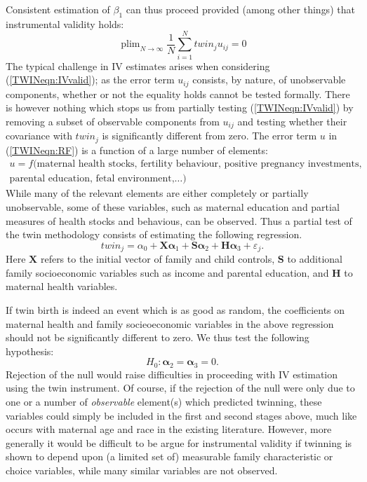 \documentclass[subeqn]{article}
\DeclareMathOperator{\plim}{plim}
\begin{document}
\begin{spacing}{1.4}
Consistent estimation of $\beta_1$ can thus proceed provided (among other
things) that instrumental validity holds:
\begin{equation}
\label{TWINeqn:IVvalid}
\plim_{N\to \infty} \frac{1}{N}\sum_{i=1}^N twin_ju_{ij}=0
\end{equation}
The typical challenge in IV estimates arises when considering 
(\ref{TWINeqn:IVvalid}); as the error term $u_{ij}$ consists, by nature, of 
unobservable components, whether or not the equality holds cannot be tested 
formally.  There is however nothing which stops us from partially testing 
(\ref{TWINeqn:IVvalid}) by removing a subset of observable components from $u_{ij}$
and testing whether their covariance with $twin_j$ is significantly different
from zero.  The error term $u$ in (\ref{TWINeqn:RF}) is a function of a large 
number of elements:
\begin{equation}
\label{TWINeqn:IVbias}
\begin{split}
u=f(\text{maternal health stocks, fertility behaviour, positive pregnancy investments,}  \\
\text{parental education, fetal environment,}\ldots)
\end{split}
\end{equation}
While many of the relevant elements are either completely or partially 
unobservable, some of these variables, such as maternal education and partial 
measures of health stocks and behavious, can be observed.  Thus a partial test 
of the twin methodology consists of estimating the following regression.
\begin{equation}
\label{TWINeqn:twinreg}
twin_{j}=\alpha_0 + \bm{X}\bm{\alpha}_1 + \bm{S}\bm{\alpha}_2
                  + \bm{H}\bm{\alpha}_3 + \varepsilon_{j}.
\end{equation}
Here $\bm{X}$ refers to the initial vector of family and child controls, $\bm{S}$
to additional family socioeconomic variables such as income and parental 
education, and $\bm{H}$ to maternal health variables.  

If twin birth is indeed an event which is as good as random, the coefficients
on maternal health and family socieoeconomic variables in the above regression
should not be significantly different to zero.  We thus test the following 
hypothesis:
\begin{equation}
\label{TWINeqn:twintest}
H_0: \bm{\alpha}_2 = \bm{\alpha}_3 = 0.
\end{equation}
Rejection of the null would raise difficulties in proceeding with IV estimation 
using the twin instrument. Of course, if the rejection of the null were only due 
to one or a number of \emph{observable} element(s) which predicted twinning, 
these variables could simply be included in the first and second stages above, 
much like occurs with maternal age and race in the existing literature.  However, 
more generally it would be difficult to be argue for instrumental validity if 
twinning is shown to depend upon (a limited set of) measurable family 
characteristic or choice variables, while many similar variables are not observed.


\end{spacing}
\end{document}
